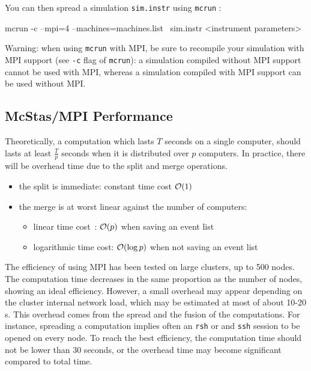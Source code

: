 You can then spread a simulation \verb'sim.instr' using \verb'mcrun' :
\begin{bash}
  mcrun -c --mpi=4 --machines=machines.list \
        sim.instr <instrument parameters>
\end{bash}

\begin{paragraph}{Warning:} when using \verb'mcrun' with MPI, be sure to
  recompile your simulation with MPI support (see \verb'-c' flag of
  \verb'mcrun'): a simulation compiled without MPI support cannot be used with
  MPI, whereas a simulation compiled with MPI support can be used without MPI.
\end{paragraph}

\subsection{McStas/MPI Performance}

Theoretically, a computation which lasts $T$ seconds on a single computer,
should lasts at least $\frac{T}{p}$ seconds when it is distributed over $p$
computers. In practice, there will be overhead time due to the split and merge
operations.
\begin{itemize}
\item the split is immediate: constant time cost ${\cal O}(1)$
\item the merge is at worst linear against the number of computers:
  \begin{itemize}
  \item linear time cost~: ${\cal O}(p)$ when saving an event list
  \item logarithmic time cost: ${\cal O}(\log{p})$ when not saving an
  event list
  \end{itemize}
\end{itemize}

The efficiency of \MCS using MPI has been tested on large clusters, up to 500
nodes.  The computation time decreases in the same proportion as the number of
nodes, showing an ideal efficiency. However, a small overhead may appear
depending on the cluster internal network load, which may be estimated at most
of about 10-20 s.  This overhead comes from the spread and the fusion of the
computations. For instance, spreading a computation implies often an \verb'rsh'
or and \verb'ssh' session to be opened on every node.  To reach the best
efficiency, the computation time should not be lower than 30 seconds, or the
overhead time may become significant compared to total time.

